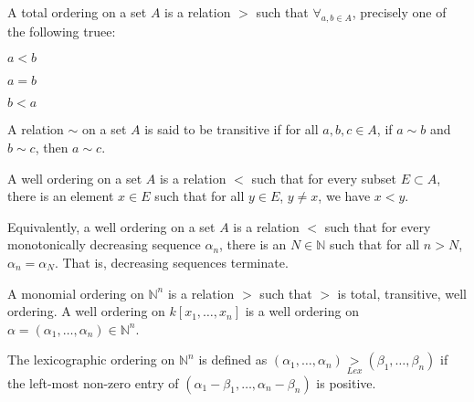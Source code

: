 \documentclass[crop=false,class=article,oneside]{standalone}
\begin{document}
        \begin{definition}
            A total ordering on a set $A$ is a relation
            $>$ such that $\forall_{a,b\in A}$, precisely one
            of the following truee:
            \begin{enumerate}
                \begin{multicols}{3}
                    \item $a<b$
                    \item $a=b$
                    \item $b<a$
                \end{multicols}
            \end{enumerate}
        \end{definition}
        \begin{definition}
            A relation $\sim$ on a set $A$ is said to be
            transitive if for all $a,b,c\in A$, if $a\sim b$ and
            $b\sim c$, then $a\sim c$.
        \end{definition}
        \begin{definition}
            A well ordering on a set $A$ is a relation $<$
            such that for every subset $E\subset A$, there is an
            element $x\in E$ such that for all $y\in E$, $y\ne x$,
            we have $x<y$.
        \end{definition}
        \begin{remark}
            Equivalently, a well ordering on a set $A$
            is a relation $<$ such that for every monotonically
            decreasing sequence $\alpha_n$, there is an
            $N\in \mathbb{N}$ such that for all $n>N$,
            $\alpha_n = \alpha_N$. That is,
            decreasing sequences terminate.
        \end{remark}
        \begin{definition}
            A monomial ordering on $\mathbb{N}^n$ is a relation
            $>$ such that $>$ is total, transitive, well
            ordering. A well ordering on $k[x_1,\hdots ,x_n]$
            is a well ordering on
            $\alpha=(\alpha_1,\hdots,\alpha_n)\in\mathbb{N}^n$.
        \end{definition}
        \begin{definition}
            The lexicographic ordering on $\mathbb{N}^n$ is
            defined as
            $(\alpha_1,\hdots,\alpha_n)\underset{Lex}{>}%
             (\beta_1,\hdots,\beta_n)$
            if the left-most non-zero entry of
            $(\alpha_1-\beta_1,\hdots, \alpha_n-\beta_n)$
            is positive.
        \end{definition}
\end{document}
